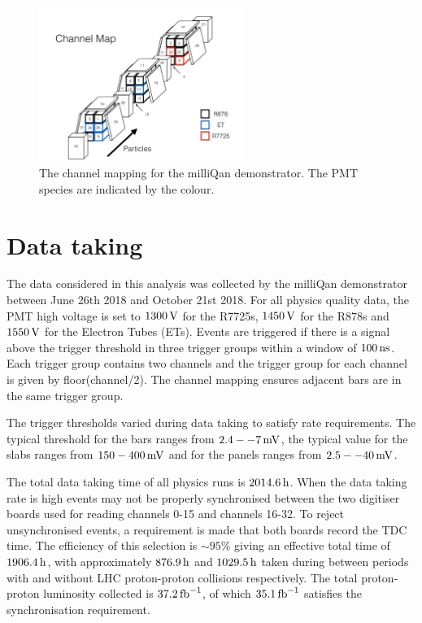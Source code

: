\documentclass[12pt]{article}
\newcommand{\unit}[1]{\ensuremath{\text{\,#1}}\xspace}
\newcommand{\fbinv} {\mbox{\ensuremath{\,\text{fb}^{-1}}}\xspace}
\begin{document}
\begin{figure}
    \centering
    \includegraphics[width=0.6\textwidth]{figures/channelMap}
    \caption{\label{fig:channelMap} The channel mapping for the milliQan demonstrator. 
    The PMT species are indicated by the colour.}
\end{figure}

\section{Data taking}

The data considered in this analysis was collected by the milliQan demonstrator between June 26th 2018 and October 21st 2018.
For all physics quality data, the PMT high voltage is set to $1300\unit{V}$ for the R7725s, $1450\unit{V}$ for the R878s
and $1550\unit{V}$ for the Electron Tubes (ETs). Events are triggered if there is a signal above the trigger threshold 
in three trigger groups within a window of $100\unit{ns}$. Each trigger group contains two channels and the trigger
group for each channel is given by floor(channel/2). The channel mapping ensures adjacent bars are in the same trigger group. 

The trigger thresholds varied during data taking to satisfy rate requirements. The typical 
threshold for the bars ranges from $2.4--7\unit{mV}$, the typical value for the slabs ranges from $150-400\unit{mV}$ and 
for the panels ranges from $2.5--40\unit{mV}$.

The total data taking time of all physics runs is $2014.6\unit{h}$. When the data taking rate is high
events may not be properly synchronised between the two digitiser boards used for reading channels 0-15 and 
channels 16-32. To reject unsynchronised events, a requirement is made that both boards record
the TDC time. The efficiency of this selection is $\sim 95\%$ giving an effective total
time of $1906.4\unit{h}$, with approximately $876.9\unit{h}$ and $1029.5\unit{h}$ 
taken during between periods with and without LHC proton-proton collisions respectively.
The total proton-proton luminosity collected is $37.2\fbinv$, of which $35.1\fbinv$ 
satisfies the synchronisation requirement. 
\end{document}
